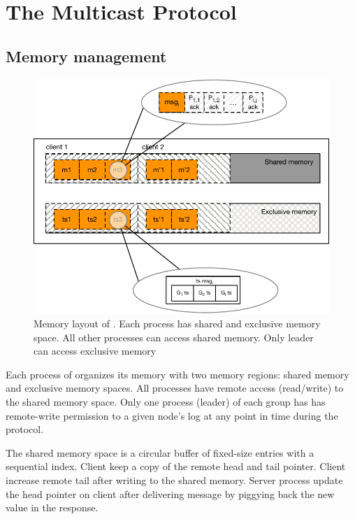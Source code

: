 \section{The Multicast Protocol}

\subsection{Memory management}

\begin{figure}[ht!]
  \centering
  \includegraphics[width=1\linewidth]{figures/memory}
  \caption{Memory layout of \proto. Each process has shared and exclusive memory
  space. All other processes can access shared memory. Only leader can access
  exclusive memory }
  \label{fig:normal_operation_time}
\end{figure}

Each process of \proto organizes its memory with two memory regions: shared
memory and exclusive memory spaces. All processes have remote access
(read/write) to the shared memory space. Only one process (leader) of each group
has has remote-write permission to a given node’s log at any point in time
during the protocol.

The shared memory space is a circular buffer of fixed-size entries with a
sequential index. Client keep a copy of the remote head and tail pointer. Client
increase remote tail after writing to the shared memory. Server process update
the head pointer on client after delivering message by piggying back the new
value in the response.

